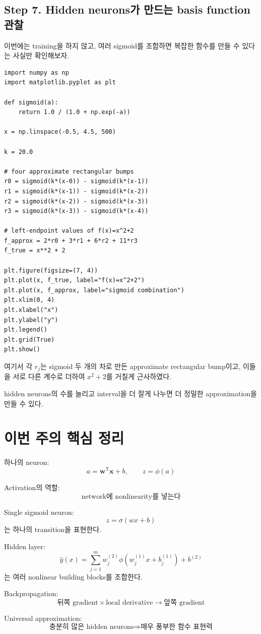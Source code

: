 \documentclass[11pt,a4paper]{article}
\newcommand{\vect}[1]{\bm{#1}}
\newcommand{\T}{^{\mathsf T}}
\newcommand{\sigmoid}{\sigma}
\begin{document}
\subsection{Step 7. Hidden neurons가 만드는 basis function 관찰}

이번에는 training을 하지 않고,
여러 sigmoid를 조합하면 복잡한 함수를 만들 수 있다는 사실만 확인해보자.

\begin{lstlisting}
import numpy as np
import matplotlib.pyplot as plt

def sigmoid(a):
    return 1.0 / (1.0 + np.exp(-a))

x = np.linspace(-0.5, 4.5, 500)

k = 20.0

# four approximate rectangular bumps
r0 = sigmoid(k*(x-0)) - sigmoid(k*(x-1))
r1 = sigmoid(k*(x-1)) - sigmoid(k*(x-2))
r2 = sigmoid(k*(x-2)) - sigmoid(k*(x-3))
r3 = sigmoid(k*(x-3)) - sigmoid(k*(x-4))

# left-endpoint values of f(x)=x^2+2
f_approx = 2*r0 + 3*r1 + 6*r2 + 11*r3
f_true = x**2 + 2

plt.figure(figsize=(7, 4))
plt.plot(x, f_true, label="f(x)=x^2+2")
plt.plot(x, f_approx, label="sigmoid combination")
plt.xlim(0, 4)
plt.xlabel("x")
plt.ylabel("y")
plt.legend()
plt.grid(True)
plt.show()
\end{lstlisting}

여기서 각 $r_j$는 sigmoid 두 개의 차로 만든 approximate rectangular bump이고,
이들을 서로 다른 계수로 더하여 $x^2+2$를 거칠게 근사하였다.

hidden neurons의 수를 늘리고 interval을 더 잘게 나누면
더 정밀한 approximation을 만들 수 있다.

\section{이번 주의 핵심 정리}

\begin{keybox}[핵심 구조]
하나의 neuron:
\[
\boxed{
a=\vect{w}\T\vect{x}+b,
\qquad
z=\phi(a)
}
\]

Activation의 역할:
\[
\boxed{
\text{network에 nonlinearity를 넣는다}
}
\]

Single sigmoid neuron:
\[
\boxed{
z=\sigmoid(wx+b)
}
\]
는 하나의 transition을 표현한다.

Hidden layer:
\[
\boxed{
\widehat y(x)
=
\sum_{j=1}^{m}
w_j^{(2)}
\phi(w_j^{(1)}x+b_j^{(1)})
+b^{(2)}
}
\]
는 여러 nonlinear building blocks를 조합한다.

Backpropagation:
\[
\boxed{
\text{뒤쪽 gradient}
\times
\text{local derivative}
\longrightarrow
\text{앞쪽 gradient}
}
\]

Universal approximation:
\[
\boxed{
\text{충분히 많은 hidden neurons}
\Rightarrow
\text{매우 풍부한 함수 표현력}
}
\]
\end{keybox}
\end{document}
